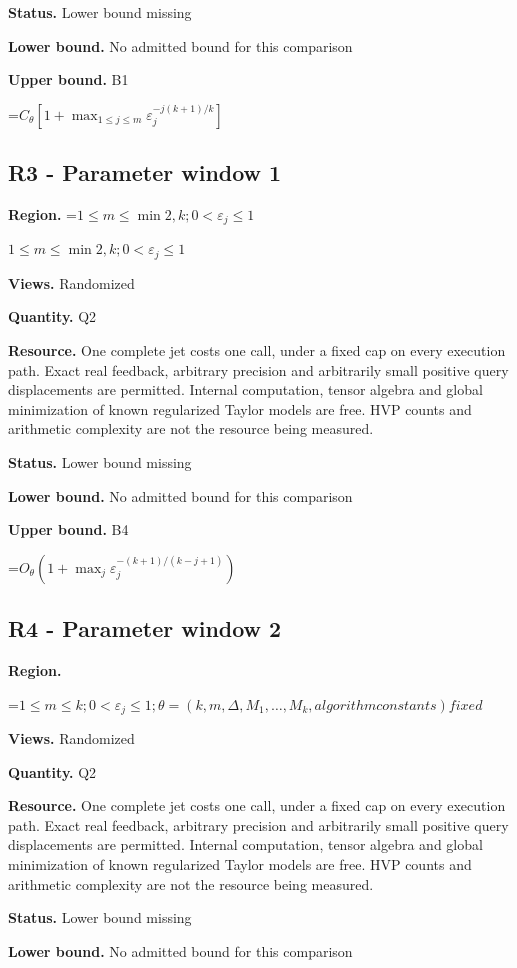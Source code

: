 \documentclass[10pt,a4paper]{article}
\newcommand{\AtlasMath}[1]{\par\begingroup\centering\setbox0=\hbox{$\displaystyle #1$}\ifdim\wd0>1.4\linewidth\typeout{ATLAS WIDE FORMULA: \the\wd0}\fi\ifdim\wd0>\linewidth\resizebox{\linewidth}{!}{\box0}\else\box0\fi\par\endgroup}
\newcommand{\AtlasInlineMath}[1]{\begingroup\setbox0=\hbox{$#1$}\ifdim\wd0>.4\linewidth\endgroup\AtlasMath{#1}\else\endgroup$#1$\fi}
\begin{document}
\textbf{Status.} Lower bound missing

\textbf{Lower bound.} No admitted bound for this comparison

\textbf{Upper bound.} B1

\AtlasMath{C_\theta[1+\max_{1\le j\le m}\varepsilon_j^{-j(k+1)/k}]}
\subsection{R3 - Parameter window 1}
\textbf{Region.} \AtlasInlineMath{1\le m\le \min{2,k};0<\varepsilon_j\le 1}

\textbf{Views.} Randomized

\textbf{Quantity.} Q2

\textbf{Resource.} One complete jet costs one call, under a fixed cap on every execution path. Exact real feedback, arbitrary precision and arbitrarily small positive query displacements are permitted. Internal computation, tensor algebra and global minimization of known regularized Taylor models are free. HVP counts and arithmetic complexity are not the resource being measured.

\textbf{Status.} Lower bound missing

\textbf{Lower bound.} No admitted bound for this comparison

\textbf{Upper bound.} B4

\AtlasMath{O_\theta(1+\max_j \varepsilon_j^{-(k+1)/(k-j+1)})}
\subsection{R4 - Parameter window 2}
\textbf{Region.} 
\AtlasMath{1\le m\le k;0<\varepsilon_j\le 1;\theta=(k,m,\Delta,M_1,\ldots,M_k,algorithm constants) fixed}


\textbf{Views.} Randomized

\textbf{Quantity.} Q2

\textbf{Resource.} One complete jet costs one call, under a fixed cap on every execution path. Exact real feedback, arbitrary precision and arbitrarily small positive query displacements are permitted. Internal computation, tensor algebra and global minimization of known regularized Taylor models are free. HVP counts and arithmetic complexity are not the resource being measured.

\textbf{Status.} Lower bound missing

\textbf{Lower bound.} No admitted bound for this comparison
\end{document}
